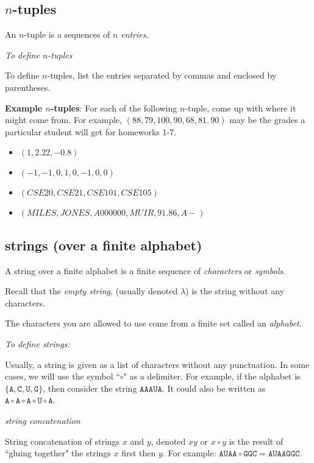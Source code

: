 \documentclass[12pt, oneside]{article}
\newcommand{\A}[0]{\texttt{A}}
\newcommand{\C}[0]{\texttt{C}}
\newcommand{\G}[0]{\texttt{G}}
\newcommand{\U}[0]{\texttt{U}}
\begin{document}
\subsection*{$n$-tuples}

An $n$-tuple is a sequences of $n$ \emph{entries}.

\emph{To define $n$-tuples}

To define $n$-tuples, list the entries separated by commas and enclosed by parentheses.

{\bf Example $n$-tuples}: For each of the following $n$-tuple, come up with where it might come from. For example, $(88, 79, 100, 90, 68, 81,90)$ may be the grades a particular student will get for homeworks 1-7.

\begin{itemize}
    \item[]$(1,2.22, -0.8)$\\
    \item[]$(-1,-1,0,1,0,-1,0,0)$\\
    \item[]$(CSE20, CSE21, CSE101, CSE105)$\\
    \item[]$(MILES,JONES,A000000,MUIR,91.86,A-)$
\end{itemize}


\newpage

\subsection*{strings (over a finite alphabet)}

A string over a finite alphabet is a finite sequence of \emph{characters} or \emph{symbols}.

Recall that the \emph{empty string}, (usually denoted $\lambda$) is the string without any characters.

The characters you are allowed to use come from a finite set called an \emph{alphabet}.

\emph{To define strings:}

Usually, a string is given as a list of characters without any punctuation. In some cases, we will use the symbol ``$\circ$" as a delimiter. For example, if the alphabet is $\{\A,\C,\U,\G\}$, then consider the string $\A\A\A\U\A$. It could also be written as $\A\circ\A\circ\A\circ\U\circ\A$.

\emph{string concatenation}

String concatenation of strings $x$ and $y$, denoted $xy$ or $x\circ y$ is the result of ``gluing together" the strings $x$ first then $y$. For example: $\A\U\A\A\circ \G\G\C=\A\U\A\A\G\G\C$.
\end{document}
